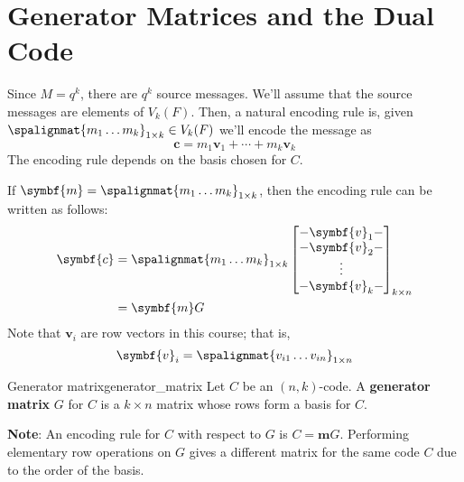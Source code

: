 \section{Generator Matrices and the Dual Code}

Since $ M=q^k $, there are $ q^k $ source messages. We'll assume that the source
messages are elements of $ V_k(F) $. Then, a natural encoding rule is,
given $ \spalignmat{m_1 \ldots{} m_k}_{1\times k}\in V_k(F) $ we'll encode the message as
\[ \symbf{c}=m_1\symbf{v}_1+\cdots+m_k\symbf{v}_k \]
The encoding rule depends on the basis chosen for $ C $.

If $ \symbf{m}=\spalignmat{m_1 \ldots{} m_k}_{1\times k} $,
then the encoding rule can be written as follows:
\begin{align*}
    \symbf{c} & =\spalignmat{m_1 \ldots{} m_k}_{1\times k}
    \begin{bmatrix}
        -\symbf{v}_1- \\
        -\symbf{v}_2- \\
        \vdots        \\
        -\symbf{v}_k-
    \end{bmatrix}_{k\times n}                 \\
              & =\symbf{m}G
\end{align*}
Note that $ \symbf{v}_i $ are row vectors in this course; that is,
\[ \symbf{v}_i=\spalignmat{v_{i1} \ldots{} v_{in}}_{1\times n} \]

\begin{Definition}{Generator matrix}{generator_matrix}
    Let $ C $ be an $ (n,k) $-code. A \textbf{generator matrix} $ G $
    for $ C $ is a $ k\times n $ matrix whose rows form a basis for $ C $.
\end{Definition}

\textbf{Note}: An encoding rule for $ C $ with respect to $ G $ is $ C=\symbf{m}G $.
Performing elementary row operations on $ G $ gives
a different matrix for the same code $ C $ due to the order of the basis.
